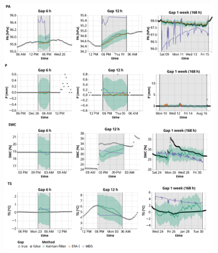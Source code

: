 \documentclass{article}
\newcommand{\imgwidth}{6in}
\let\Oldsubsection\subsection
\renewcommand{\subsection}{\FloatBarrier\Oldsubsection}
\begin{document}
\begin{figure}
\centerline{\includegraphics[width=\imgwidth]{timeseries_2_2}}
\caption{}
\label{fig:ts_3-2}
\end{figure}
\restoregeometry


\newcommand{\CapGapLen}{Imputation performance of the KF in comparison to the state-of-the-art
methods: ERA-Interim (ERA-I) and Marginal Distribution Sampling (MDS), using mean and standard deviation of the \textit{Root Mean Square Error} (RMSE). The best method for each gap length is highlighted in bold. For each combination of gap length and variable, 500 artificial gaps were created.}


\newcommand{\CapControl}{Comparison of the KF performance between a model that uses control variables (\textit{KF-Gen-Sin-6\_336}) and models that do not use control variables (\textit{KF-Gen-Sin-6\_336-No\_Contr}). The table displays the mean, the standard deviation (std) and the standard error (se) of the \textit{Root Mean Square Error} (RMSE). In addition the difference (diff.) between the mean of two models is shown. The best method for each gap length is highlighted in bold. For each combination of gap length and variable, 500 artificial gaps were created.}

\end{document}
